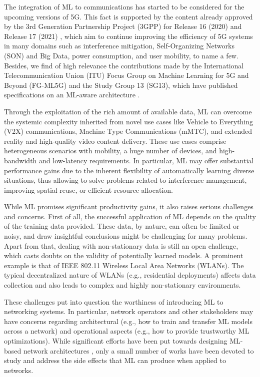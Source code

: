 \documentclass[journal]{IEEEtran}
\begin{document}
	The integration of ML to communications has started to be considered for the upcoming versions of 5G. This fact is supported by the content already approved by the 3rd Generation Partnership Project (3GPP) for Release 16 (2020) and Release 17 (2021) \cite{3gpp2019study}, which aim to continue improving the efficiency of 5G systems in many domains such as interference mitigation, Self-Organizing Networks (SON) and Big Data, power consumption, and user mobility, to name a few. Besides, we find of high relevance the contributions made by the International Telecommunication Union (ITU) Focus Group on Machine Learning for 5G and Beyond (FG-ML5G) and the Study Group 13 (SG13), which have published specifications on an ML-aware architecture \cite{ITU3172, ITU3174}.
	
	Through the exploitation of the rich amount of available data, ML can overcome the systemic complexity inherited from novel use cases like Vehicle to Everything (V2X) communications, Machine Type Communications (mMTC), and extended reality and high-quality video content delivery. These use cases comprise heterogeneous scenarios with mobility, a huge number of devices, and high-bandwidth and low-latency requirements. In particular, ML may offer substantial performance gains due to the inherent flexibility of automatically learning diverse situations, thus allowing to solve problems related to interference management, improving spatial reuse, or efficient resource allocation.
	
	While ML promises significant productivity gains, it also raises serious challenges and concerns. First of all, the successful application of ML depends on the quality of the training data provided. These data, by nature, can often be limited or noisy, and draw insightful conclusions might be challenging for many problems. Apart from that, dealing with non-stationary data is still an open challenge, which casts doubts on the validity of potentially learned models. A prominent example is that of IEEE 802.11 Wireless Local Area Networks (WLANs). The typical decentralized nature of WLANs (e.g., residential deployments) affects data collection and also leads to complex and highly non-stationary environments.
	
	These challenges put into question the worthiness of introducing ML to networking systems. In particular, network operators and other stakeholders may have concerns regarding architectural (e.g., how to train and transfer ML models across a network) and operational aspects (e.g., how to provide trustworthy ML optimizations). While significant efforts have been put towards designing ML-based network architectures \cite{3gpp2019study, ETSI, ITU3172, ITU3174}, only a small number of works have been devoted to study and address the side effects that ML can produce when applied to networks. 
\end{document}
